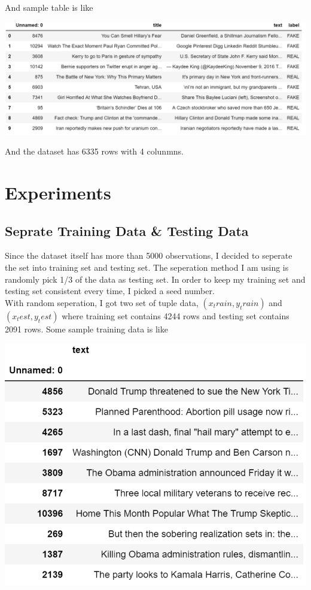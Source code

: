 \documentclass[twoside,twocolumn]{article}
\begin{document}
    \noindent And sample table is like

    \noindent \includegraphics[scale=0.4]{figures/data_table.png}

    \noindent And the dataset has 6335 rows with 4 colunmns.


    \section{Experiments}
    
    \subsection{Seprate Training Data \& Testing Data}
    Since the dataset itself has more than 5000 observations, I decided to seperate
    the set into training set and testing set. The seperation method I am using is randomly pick 1/3 of the 
    data as testing set. In order to keep my training set and testing set consistent every time, I picked a 
    seed number.
    \\ With random seperation, I got two set of tuple data, $(x_train, y_train)$
    and $(x_test, y_test)$ where training set contains 4244 rows and testing set
    contains 2091 rows. Some sample training data is like
    
    \noindent \includegraphics[scale=0.8]{figures/train_data.png}
    
\end{document}
